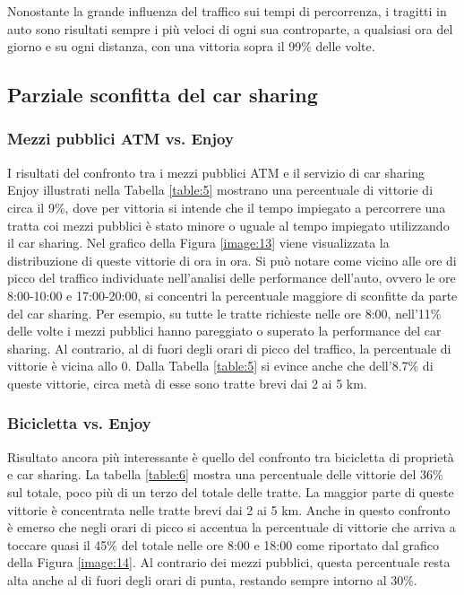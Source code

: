 Nonostante la grande influenza del traffico sui tempi di percorrenza, i tragitti in auto sono risultati sempre i più veloci di ogni sua controparte, a qualsiasi ora del giorno e su ogni distanza, con una vittoria sopra il 99\% delle volte.

\subsection{Parziale sconfitta del car sharing}

\subsubsection{Mezzi pubblici ATM vs. Enjoy}

I risultati del confronto tra i mezzi pubblici ATM e il servizio di car sharing Enjoy illustrati nella Tabella \ref{table:5} mostrano una percentuale di vittorie di circa il 9\%, dove per vittoria si intende che il tempo impiegato a percorrere una tratta coi mezzi pubblici è stato minore o uguale al tempo impiegato utilizzando il car sharing. Nel grafico della Figura \ref{image:13} viene visualizzata la distribuzione di queste vittorie di ora in ora. Si può notare come vicino alle ore di picco del traffico individuate nell'analisi delle performance dell'auto, ovvero le ore 8:00-10:00 e 17:00-20:00, si concentri la percentuale maggiore di sconfitte da parte del car sharing. Per esempio, su tutte le tratte richieste nelle ore 8:00, nell'11\% delle volte i mezzi pubblici hanno pareggiato o superato la performance del car sharing. Al contrario, al di fuori degli orari di picco del traffico, la percentuale di vittorie è vicina allo 0. Dalla Tabella \ref{table:5} si evince anche che dell'8.7\% di queste vittorie, circa metà di esse sono tratte brevi dai 2 ai 5 km.

\subsubsection{Bicicletta vs. Enjoy}

Risultato ancora più interessante è quello del confronto tra bicicletta di proprietà e car sharing. La tabella \ref{table:6} mostra una percentuale delle vittorie del 36\% sul totale, poco più di un terzo del totale delle tratte. La maggior parte di queste vittorie è concentrata nelle tratte brevi dai 2 ai 5 km. Anche in questo confronto è emerso che negli orari di picco si accentua la percentuale di vittorie che arriva a toccare quasi il 45\% del totale nelle ore 8:00 e 18:00 come riportato dal grafico della Figura \ref{image:14}. Al contrario dei mezzi pubblici, questa percentuale resta alta anche al di fuori degli orari di punta, restando sempre intorno al 30\%.

